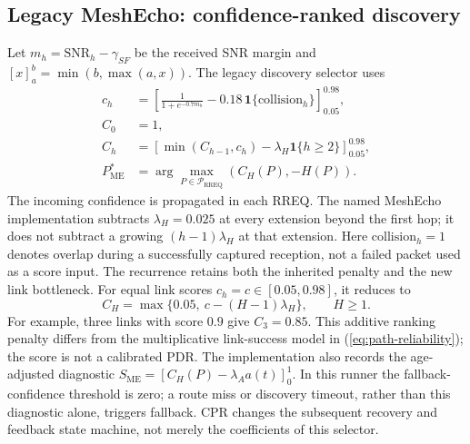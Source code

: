 \documentclass[conference,letterpaper,10pt]{IEEEtran}
\begin{document}
\subsection{Legacy MeshEcho: confidence-ranked discovery}
Let $m_h=\mathrm{SNR}_h-\gamma_{SF}$ be the received SNR margin and
$[x]_a^b=\min(b,\max(a,x))$. The legacy discovery selector uses
\begin{equation}
\begin{aligned}
c_h&=\left[\frac{1}{1+e^{-0.7m_h}}
       -0.18\,\mathbf 1\{\mathrm{collision}_h\}\right]_{0.05}^{0.98},\\
C_0&=1,\\
C_h&=\left[\min(C_{h-1},c_h)-\lambda_H\mathbf 1\{h\geq2\}\right]_{0.05}^{0.98},\\
P_{\mathrm{ME}}^*&=\arg\max_{P\in\mathcal P_{\mathrm{RREQ}}}(C_H(P),-H(P)).
\end{aligned}
\label{eq:meshecho-score}
\end{equation}
The incoming confidence is propagated in each RREQ. The named MeshEcho
implementation subtracts $\lambda_H=0.025$ at every extension beyond the
first hop; it does not subtract a growing $(h-1)\lambda_H$ at that extension.
Here $\mathrm{collision}_h=1$ denotes overlap during a successfully captured
reception, not a failed packet used as a score input.
The recurrence retains both the inherited penalty and the new link bottleneck.
For equal link scores $c_h=c\in[0.05,0.98]$, it reduces to
\begin{equation}
C_H=\max\{0.05,\ c-(H-1)\lambda_H\},\qquad H\geq1.
\label{eq:legacy-hop-penalty}
\end{equation}
For example, three links with score $0.9$ give $C_3=0.85$.
This additive ranking penalty differs from the multiplicative link-success
model in (\ref{eq:path-reliability}); the score is not a calibrated PDR.
The implementation also records the age-adjusted diagnostic
$S_{\mathrm{ME}}=[C_H(P)-\lambda_A a(t)]_0^1$.
In this runner the fallback-confidence threshold is zero; a route miss or
discovery timeout, rather than this diagnostic alone, triggers fallback.
CPR changes the subsequent recovery and feedback state machine, not merely
the coefficients of this selector.
\end{document}
